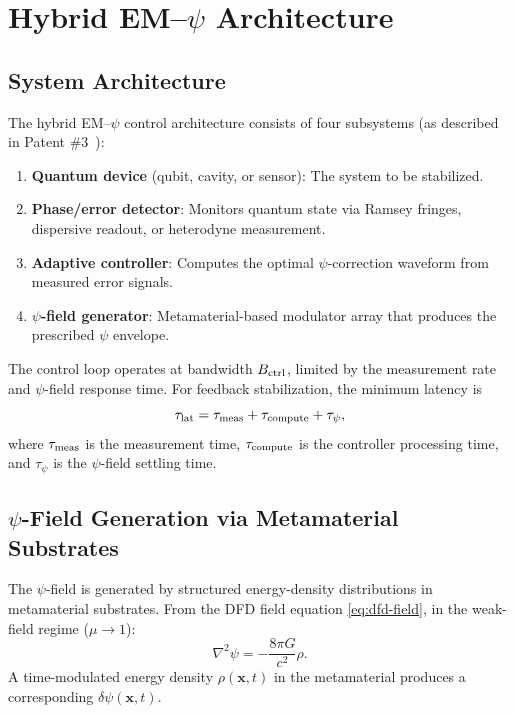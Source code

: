 \documentclass[aps,prd,twocolumn,superscriptaddress,nofootinbib]{revtex4-2}
\begin{document}
\section{Hybrid EM--$\psi$ Architecture}\label{sec:hybrid}

\subsection{System Architecture}

The hybrid EM--$\psi$ control architecture consists of four subsystems
(as described in Patent \#3~\cite{Alcock2025Patent3}):

\begin{enumerate}
\item \textbf{Quantum device} (qubit, cavity, or sensor): The system to
be stabilized.
\item \textbf{Phase/error detector}: Monitors quantum state via Ramsey
fringes, dispersive readout, or heterodyne measurement.
\item \textbf{Adaptive controller}: Computes the optimal $\psi$-correction
waveform from measured error signals.
\item \textbf{$\psi$-field generator}: Metamaterial-based modulator array
that produces the prescribed $\psi$ envelope.
\end{enumerate}

The control loop operates at bandwidth $B_{\rm ctrl}$, limited by the
measurement rate and $\psi$-field response time. For feedback
stabilization, the minimum latency is
\begin{equation}
\tau_{\rm lat} = \tau_{\rm meas} + \tau_{\rm compute} + \tau_\psi,
\end{equation}
where $\tau_{\rm meas}$ is the measurement time, $\tau_{\rm compute}$ is
the controller processing time, and $\tau_\psi$ is the $\psi$-field
settling time.

\subsection{$\psi$-Field Generation via Metamaterial Substrates}

The $\psi$-field is generated by structured energy-density distributions
in metamaterial substrates. From the DFD field equation
\eqref{eq:dfd-field}, in the weak-field regime ($\mu \to 1$):
\begin{equation}
\nabla^2\psi = -\frac{8\pi G}{c^2}\rho.
\end{equation}
A time-modulated energy density $\rho(\mathbf{x},t)$ in the metamaterial
produces a corresponding $\delta\psi(\mathbf{x},t)$.
\end{document}
